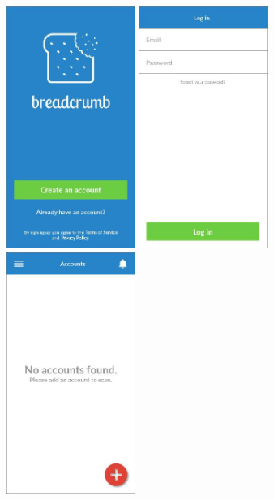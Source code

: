 \begin{figure}
  \subfigures
  \centering
  \begin{minipage}{4.6cm}
    \centering
    \includegraphics[width=4.2cm]{inc/ui_lg_step1.jpg}
    \caption{}
    \label{fig:ui_lg_step1}
  \end{minipage}
  \begin{minipage}{4.6cm}
    \centering
    \includegraphics[width=4.2cm]{inc/ui_lg_step2.jpg}
    \caption{}
    \label{fig:ui_lg_step2}
  \end{minipage}
  \begin{minipage}{4.6cm}
    \centering
    \includegraphics[width=4.2cm]{inc/ui_lg_step3.jpg}
    \caption{}
    \label{fig:ui_lg_step3}
  \end{minipage}
\end{figure}


